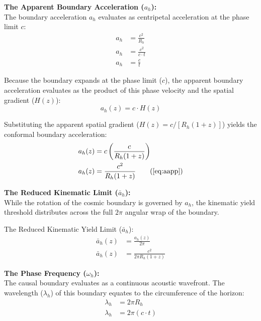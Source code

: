 \vspace{0.2 cm}
\textbf{The Apparent Boundary Acceleration ($a_{h}$):} \\ 
The boundary acceleration $a_{h}$ evaluates as centripetal acceleration at the phase limit $c$:
\begin{align}
    a_{h} &= \frac{c^2}{R_h} \\
    a_{h} &= \frac{c^2}{c \cdot t} \\
    a_{h} &= \frac{c}{t}
\end{align}

Because the boundary expands at the phase limit ($c$), the apparent boundary acceleration evaluates as the product of this phase velocity and the spatial gradient ($H(z)$):
\begin{equation}
    a_{h}(z) = c \cdot H(z)
\end{equation}

Substituting the apparent spatial gradient ($H(z) = c / [R_{h}(1+z)]$) yields the conformal boundary acceleration:
\begin{align}
    a_{h}(z) &= c \left( \frac{c}{R_{h}(1+z)} \right) \\
    a_{h}(z) &= \frac{c^2}{R_{h}(1+z)} \tag{\ref{eq:aapp}}
\end{align}

\vspace{0.2 cm}
\textbf{The Reduced Kinematic Limit ($\bar{a}_h$):} \\ 
While the rotation of the cosmic boundary is governed by $a_{h}$, the kinematic yield threshold distributes across the full $2\pi$ angular wrap of the boundary. 

The Reduced Kinematic Yield Limit ($\bar{a}_h$):
\begin{align}
    \bar{a}_h(z) &= \frac{a_{h}(z)}{2\pi} \nonumber \\
    \bar{a}_h(z) &= \frac{c^2}{2\pi R_{h}(1+z)} \label{eq:a0_bar}
\end{align}

\vspace{0.2 cm}
\textbf{The Phase Frequency ($\omega_h$):} \\
The causal boundary evaluates as a continuous acoustic wavefront. The wavelength ($\lambda_h$) of this boundary equates to the circumference of the horizon:
\begin{align}
    \lambda_h &= 2\pi R_h \\
    \lambda_h &= 2\pi (c \cdot t)
\end{align}

